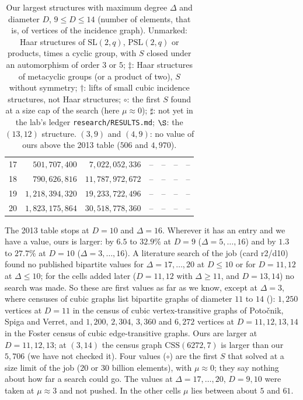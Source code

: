 \documentclass[11pt]{amsart}
\theoremstyle{definition}
\theoremstyle{remark}
\begin{document}
\begin{table}[ht]
\begin{tabular}{@{}r*{6}{r}@{}}
17 & $501{,}707{,}400$ & $7{,}022{,}052{,}336$ & -- & -- & -- & --\\
18 & $790{,}626{,}816$ & $11{,}787{,}972{,}672$ & -- & -- & -- & --\\
19 & $1{,}218{,}394{,}320$ & $19{,}233{,}722{,}496$ & -- & -- & -- & --\\
20 & $1{,}823{,}175{,}864$ & $30{,}518{,}778{,}360$ & -- & -- & -- & --\\
\bottomrule
\end{tabular}
\caption{Our largest structures with maximum degree $\Delta$ and diameter $D$, $9\le D\le14$ (number of elements, that is, of vertices of the incidence graph). Unmarked: Haar structures of $\mathrm{SL}(2,q)$, $\mathrm{PSL}(2,q)$ or products, times a cyclic group, with $S$ closed under an automorphism of order $3$ or $5$; ${\ddagger}$: Haar structures of metacyclic groups (or a product of two), $S$ without symmetry; ${\dagger}$: lifts of small cubic incidence structures, not Haar structures; ${\circ}$: the first $S$ found at a size cap of the search (here $\mu\approx0$); ${\sharp}$: not yet in the lab's ledger \texttt{research/RESULTS.md}; ${\S}$: the $(13,12)$ structure. $(3,9)$ and $(4,9)$: no value of ours above the 2013 table ($506$ and $4{,}970$).}
\label{tab:haarvalues}
\end{table}

The 2013 table \cite{MS13} stops at $D=10$ and $\Delta=16$. Wherever it has an entry and we have a value, ours is larger: by $6.5$ to $32.9\%$ at $D=9$ ($\Delta=5,\dots,16$) and by $1.3$ to $27.7\%$ at $D=10$ ($\Delta=3,\dots,16$). A literature search of the job  (card r2/d10) found no published bipartite values for $\Delta=17,\dots,20$ at $D\le10$ or for $D=11,12$ at $\Delta\le10$; for the cells added later ($D=11,12$ with $\Delta\ge11$, and $D=13,14$) no search was made. So these are first values as far as we know, except at $\Delta=3$, where censuses of cubic graphs list bipartite graphs of diameter $11$ to $14$ (): $1{,}250$ vertices at $D=11$ in the census of cubic vertex-transitive graphs of Poto\v{c}nik, Spiga and Verret, and $1{,}200$, $2{,}304$, $3{,}360$ and $6{,}272$ vertices at $D=11,12,13,14$ in the Foster census of cubic edge-transitive graphs. Ours are larger at $D=11,12,13$; at $(3,14)$ the census graph $\mathrm{CSS}(6272,7)$ is larger than our $5{,}706$ (we have not checked it). Four values (${\circ}$) are the first $S$ that solved at a size limit of the job ($20$ or $30$ billion elements), with $\mu\approx0$; they say nothing about how far a search could go. The values at $\Delta=17,\dots,20$, $D=9,10$ were taken at $\mu\approx3$ and not pushed. In the other cells $\mu$ lies between about $5$ and $61$.
\end{document}
